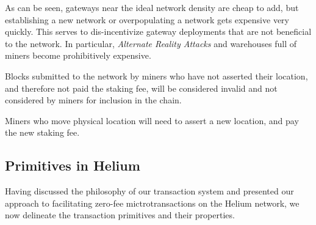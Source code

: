 \documentclass[10pt, nonatbib, nocopyrightspace, reprint]{sigplanconf}
\begin{document}
As can be seen, gateways near the ideal network density are cheap to add, but establishing a new network or overpopulating a network gets expensive very quickly. This serves to dis-incentivize gateway deployments that are not beneficial to the network. In particular, \emph{Alternate Reality Attacks} and warehouses full of miners become prohibitively expensive.

Blocks submitted to the network by miners who have not asserted their location, and therefore not paid the staking fee, will be considered invalid and not considered by miners for inclusion in the chain.

Miners who move physical location will need to assert a new location, and pay the new staking fee.

\subsection{Primitives in Helium} \label{primitives}
Having discussed the philosophy of our transaction system and presented our approach to facilitating zero-fee mictrotransactions on the Helium network, we now delineate the transaction primitives and their properties.
\end{document}
